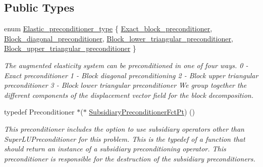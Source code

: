 \subsection*{Public Types}
\begin{DoxyCompactItemize}
\item 
enum \hyperlink{classoomph_1_1PseudoElasticPreconditionerOld_a6748360e3e2fbd4766d837a520dadfd0}{Elastic\+\_\+preconditioner\+\_\+type} \{ \hyperlink{classoomph_1_1PseudoElasticPreconditionerOld_a6748360e3e2fbd4766d837a520dadfd0a6715e85e01ea15dda633e9752d1b2df4}{Exact\+\_\+block\+\_\+preconditioner}, 
\hyperlink{classoomph_1_1PseudoElasticPreconditionerOld_a6748360e3e2fbd4766d837a520dadfd0ab93e9663b3ce2d96ceb2f48b99802120}{Block\+\_\+diagonal\+\_\+preconditioner}, 
\hyperlink{classoomph_1_1PseudoElasticPreconditionerOld_a6748360e3e2fbd4766d837a520dadfd0a89ac82b79943728045e50d6d2a17a27b}{Block\+\_\+lower\+\_\+triangular\+\_\+preconditioner}, 
\hyperlink{classoomph_1_1PseudoElasticPreconditionerOld_a6748360e3e2fbd4766d837a520dadfd0a7faa51d91917bad39dbc2e27b9af7bbc}{Block\+\_\+upper\+\_\+triangular\+\_\+preconditioner}
 \}\begin{DoxyCompactList}\small\item\em The augmented elasticity system can be preconditioned in one of four ways. 0 -\/ Exact preconditioner 1 -\/ Block diagonal preconditioning 2 -\/ Block upper triangular preconditioner 3 -\/ Block lower triangular preconditioner We group together the different components of the displacement vector field for the block decomposition. \end{DoxyCompactList}
\item 
typedef Preconditioner $\ast$($\ast$ \hyperlink{classoomph_1_1PseudoElasticPreconditionerOld_a8ee80a4a55139190a6e2a16fa175e75f}{Subsidiary\+Preconditioner\+Fct\+Pt}) ()
\begin{DoxyCompactList}\small\item\em This preconditioner includes the option to use subsidiary operators other than Super\+L\+U\+Preconditioner for this problem. This is the typedef of a function that should return an instance of a subsidiary preconditioning operator. This preconditioner is responsible for the destruction of the subsidiary preconditioners. \end{DoxyCompactList}\end{DoxyCompactItemize}
